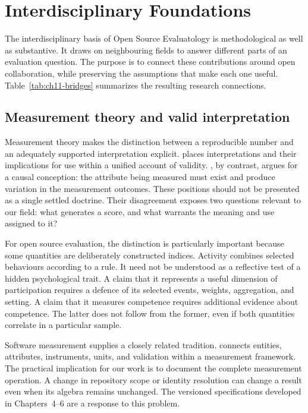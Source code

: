 \FloatBarrier
\section{Interdisciplinary Foundations}
\label{sec:ch11-interdisciplinary}

The interdisciplinary basis of Open Source Evaluatology is methodological as well as substantive. It draws on neighbouring fields to answer different parts of an evaluation question. The purpose is to connect these contributions around open collaboration, while preserving the assumptions that make each one useful. Table~\ref{tab:ch11-bridges} summarizes the resulting research connections.



\subsection{Measurement theory and valid interpretation}
Measurement theory makes the distinction between a reproducible number and an adequately supported interpretation explicit. \citet{messick1995} places interpretations and their implications for use within a unified account of validity. \citet{borsboom2004}, by contrast, argues for a causal conception: the attribute being measured must exist and produce variation in the measurement outcomes. These positions should not be presented as a single settled doctrine. Their disagreement exposes two questions relevant to our field: what generates a score, and what warrants the meaning and use assigned to it?

For open source evaluation, the distinction is particularly important because some quantities are deliberately constructed indices. Activity combines selected behaviours according to a rule. It need not be understood as a reflective test of a hidden psychological trait. A claim that it represents a useful dimension of participation requires a defence of its selected events, weights, aggregation, and setting. A claim that it measures competence requires additional evidence about competence. The latter does not follow from the former, even if both quantities correlate in a particular sample.

Software measurement supplies a closely related tradition. \citet{kitchenham1995} connects entities, attributes, instruments, units, and validation within a measurement framework. The practical implication for our work is to document the complete measurement operation. A change in repository scope or identity resolution can change a result even when its algebra remains unchanged. The versioned specifications developed in Chapters~4--6 are a response to this problem.

